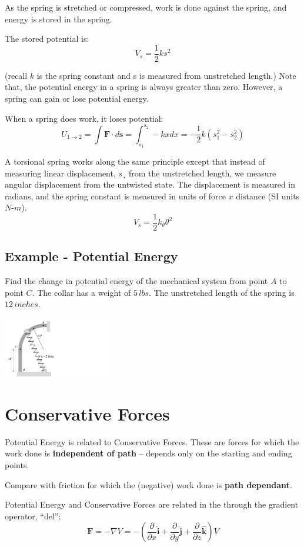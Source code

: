 \documentclass[12pt,letterpaper,twoside]{report}
\begin{document}
As the spring is stretched or compressed, work is done against the spring, and energy is stored in the spring.  

The stored potential is:
\[
V_s = \frac{1}{2} k s^2
\]

(recall $k$ is the spring constant and s is measured from unstretched length.) Note that, the potential energy in a spring is always greater than zero.  However, a spring can gain or lose potential energy.  

When a spring does work, it loses potential:
\[
\displaystyle U_{1 \rightarrow 2} = \int \bm{F} \cdot d \bm{s} = \int_{s_1}^{s_2} -kx dx = - \frac{1}{2} k(s_1^2 - s_2^2)
\]

A torsional spring works along the same principle except that instead of measuring linear displacement, $s$¸ from the unstretched length, we measure angular displacement from the untwisted state.  The displacement is measured in radians, and the spring constant is measured in units of force $x$ distance (SI units $N$-$m$).
\[
V_s = \frac{1}{2} k_{\theta} \theta^2
\]

\subsection{Example - Potential Energy}
Find the change in potential energy of the mechanical system from point $A$ to point $C$.  The collar has a weight of $5 \, lbs$.  The unstretched length of the spring is $12 \, inches$.  

 \includegraphics[trim={1cm 0cm 18cm 1cm},clip,width=0.35\textwidth, left]{Slide71}

\newpage

\section{Conservative Forces}
Potential Energy is related to Conservative Forces.  These are forces for which the work done is \textbf{independent of path} – depends only on the starting and ending points. 

Compare with friction for which the (negative) work done is \textbf{path dependant}.  

Potential Energy and Conservative Forces are related in the through the gradient operator, “del”:
\[
\displaystyle \bm{F} = - \nabla V = - \left( \frac{\partial}{\partial x} \bm{\hat{i}} + \frac{\partial}{\partial y} \bm{\hat{j}} + \frac{\partial}{\partial z} \bm{\hat{k}} \right) V
\]
\end{document}
